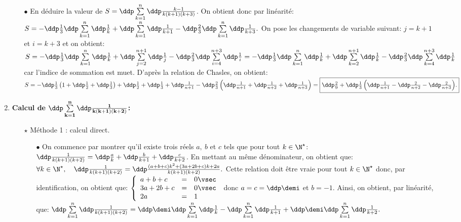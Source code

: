 \begin{correction}
\begin{enumerate}
\begin{itemize}
\item[$\bullet$] En d\'eduire la valeur de $S=\ddp \sum\limits_{k=1}^{n}  \ddp\frac{k-1}{k(k+1)(k+3)}$. On obtient donc par lin\'earit\'e:
$S=-\ddp\frac{1}{3} \ddp \sum\limits_{k=1}^{n}  \ddp\frac{1}{k}+\ddp \sum\limits_{k=1}^{n}  \ddp\frac{1}{k+1}-\ddp\frac{2}{3}\ddp \sum\limits_{k=1}^{n}  \ddp\frac{1}{k+3}.$ On pose les changements de variable suivant: $j=k+1$ et $i=k+3$ et on obtient: 
$S=-\ddp\frac{1}{3} \ddp \sum\limits_{k=1}^{n}  \ddp\frac{1}{k}+\ddp \sum\limits_{j=2}^{n+1}  \ddp\frac{1}{j}-\ddp\frac{2}{3}\ddp \sum\limits_{i=4}^{n+3}  \ddp\frac{1}{i}=-\ddp\frac{1}{3} \ddp \sum\limits_{k=1}^{n}  \ddp\frac{1}{k}+\ddp \sum\limits_{k=2}^{n+1}  \ddp\frac{1}{k}-\ddp\frac{2}{3}\ddp \sum\limits_{k=4}^{n+3}  \ddp\frac{1}{k}$ car l'indice de sommation est muet. D'apr\`{e}s la relation de Chasles, on obtient: $S=-\ddp\frac{1}{3}  \left( 1+\ddp\frac{1}{2}+\ddp\frac{1}{3} \right)+\ddp\frac{1}{2}+\ddp\frac{1}{3}+\ddp\frac{1}{n+1}-\ddp\frac{2}{3}\left( \ddp\frac{1}{n+1}+\ddp\frac{1}{n+2}+\ddp\frac{1}{n+3}\right)=\fbox{$\ddp\frac{2}{9}+\ddp\frac{1}{3}\left( \ddp\frac{1}{n+1}-\ddp\frac{2}{n+2}-\ddp\frac{2}{n+3}\right)$.}$
\end{itemize}
\item  \textbf{Calcul de $\mathbf{\ddp \sum\limits_{k=1}^{n}  \ddp\frac{1}{k(k+1)(k+2)}}$:}\\
\begin{itemize}
\item[$\star$] M\'ethode 1 : calcul direct.
\begin{itemize}
\item[$\bullet$] On commence par montrer qu'il existe trois r\'eels $a,\ b$ et $c$ tels que pour tout $k\in\N^{\star}$: $\ddp\frac{1}{k(k+1)(k+2)}=\ddp\frac{a}{k}+\ddp\frac{b}{k+1}+\ddp\frac{c}{k+2}$. En mettant au m\^{e}me d\'enominateur, on obtient que: $\forall k\in\N^{\star},\quad \ddp\frac{1}{k(k+1)(k+2)}=\ddp\frac{  (a+b+c)k^2+(3a+2b+c)k+2a }{k(k+1)(k+2)}.$
Cette relation doit \^{e}tre vraie pour tout $k\in\N^{\star}$ donc, par identification, on obtient que: $\left\lbrace \begin{array}{lll}  a+b+c&=&0\vsec\\ 3a+2b+c&=&0\vsec\\ 2a&=&1  \end{array}\right.$ donc $a=c=\ddp\demi$ et $b=-1$. Ainsi, on obtient, par lin\'earit\'e, que: $\ddp \sum\limits_{k=1}^{n}  \ddp\frac{1}{k(k+1)(k+2)}=\ddp\demi\ddp \sum\limits_{k=1}^{n}  \ddp\frac{1}{k}-\ddp \sum\limits_{k=1}^{n} \ddp\frac{1}{k+1}+\ddp\demi\ddp \sum\limits_{k=1}^{n}  \ddp\frac{1}{k+2}.$

\end{itemize}
\end{itemize}
\end{enumerate}
\end{correction}
